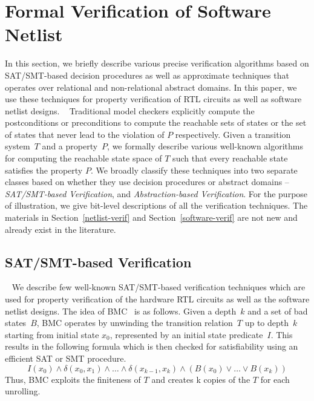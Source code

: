 \section{Formal Verification of Software Netlist}\label{sec:methodology}
%

In this section, we briefly describe various precise verification algorithms 
based on SAT/SMT-based decision procedures as well as approximate techniques 
that operates over relational and non-relational abstract domains. In this
paper, we use these techniques for property verification of RTL circuits 
as well as software netlist designs. 
%
~\label{methodology}
Traditional model checkers explicitly compute the
postconditions or preconditions to compute the reachable sets of states or
the set of states that never lead to the violation of $P$ respectively. 
%
Given a transition system~$T$ and a property~$P$, we formally describe 
various well-known algorithms for computing the reachable 
state space of $T$ such that every reachable state satisfies the property $P$. 
%
We broadly classify these techniques into two separate classes based on whether 
they use decision procedures or abstract domains -- \emph{SAT/SMT-based
Verification}, and \emph{Abstraction-based Verification}. 
%
For the purpose of illustration, we give bit-level descriptions of all 
the verification techniques.
The materials in Section~\ref{netlist-verif} and Section~\ref{software-verif} 
are not new and already exist in the literature.
%
\subsection{SAT/SMT-based Verification}~\label{netlist-verif}
%
We describe few well-known SAT/SMT-based verification techniques which are 
used for property verification of the hardware RTL circuits as well as the 
software netlist designs. 
%
%
The idea of BMC~\cite{biere} is as follows. 
Given a depth~$k$ and a set of bad states~$B$, BMC operates
by unwinding the transition relation~$T$ up to depth~$k$ starting from
initial state $x_0$, represented by an initial state predicate~$I$.
This results in the following formula which is then checked for
satisfiability using an efficient SAT or SMT procedure.
%
\[ I(x_0) \wedge \delta(x_0, x_1) \wedge \ldots 
   \wedge \delta(x_{k-1}, x_k) \wedge (B(x_0) \vee \ldots \vee B(x_k)) \]
%
Thus, BMC exploits the finiteness of $T$ and creates k copies of the
$T$ for each unrolling.

